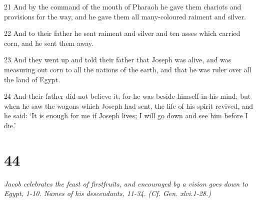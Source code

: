 \par 21 And by the command of the mouth of Pharaoh he gave them chariots and provisions for the way, and he gave them all many-coloured raiment and silver.
\par 22 And to their father he sent raiment and silver and ten asses which carried corn, and he sent them away.
\par 23 And they went up and told their father that Joseph was alive, and was measuring out corn to all the nations of the earth, and that he was ruler over all the land of Egypt.
\par 24 And their father did not believe it, for he was beside himself in his mind; but when he saw the wagons which Joseph had sent, the life of his spirit revived, and he said: ‘It is enough for me if Joseph lives; I will go down and see him before I die.’

\chapter{44}

\par \textit{Jacob celebrates the feast of firstfruits, and encouraged by a vision goes down to Egypt, 1-10. Names of his descendants, 11-34. (Cf. Gen. xlvi.1-28.)}

